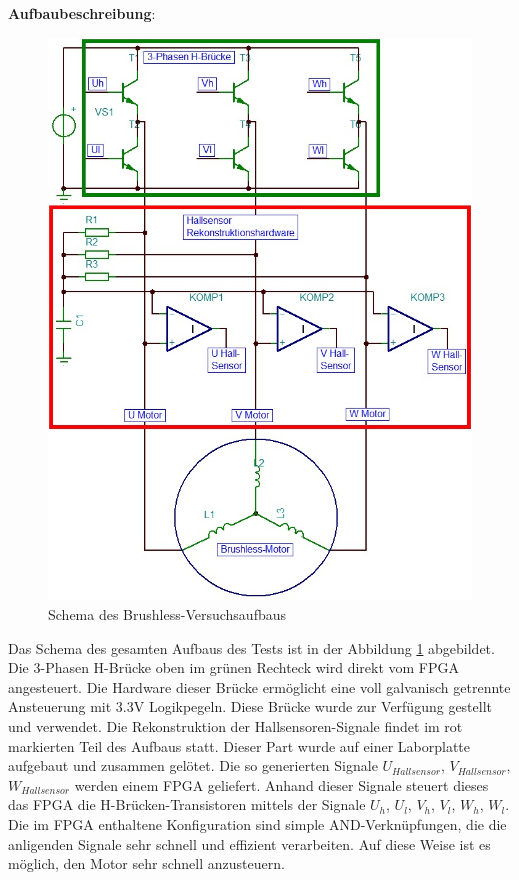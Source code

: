 \\
\\
\textbf{Aufbaubeschreibung}:
\begin{figure}
	\includegraphics[scale=0.4]{Funktionstests/Bilder/MotoransteuerungSchema.jpg}
	\centering
	\caption{Schema des Brushless-Versuchsaufbaus}
\label{abb:MotoransteuerungSchema}
\end{figure}
Das Schema des gesamten Aufbaus des Tests ist in der Abbildung \ref{abb:MotoransteuerungSchema} abgebildet. Die 3-Phasen H-Brücke oben im grünen Rechteck wird direkt vom FPGA angesteuert. Die Hardware dieser Brücke ermöglicht eine voll galvanisch getrennte Ansteuerung mit 3.3V Logikpegeln. Diese Brücke wurde zur Verfügung gestellt und verwendet. Die Rekonstruktion der Hallsensoren-Signale findet im rot markierten Teil des Aufbaus statt. Dieser Part wurde auf einer Laborplatte aufgebaut und zusammen gelötet. Die so generierten Signale $U_{Hallsensor}$, $V_{Hallsensor}$, $W_{Hallsensor}$ werden einem FPGA geliefert. Anhand dieser Signale steuert dieses das FPGA die H-Brücken-Transistoren mittels der Signale $U_h$, $U_l$, $V_h$, $V_l$, $W_h$, $W_l$. Die im FPGA enthaltene Konfiguration sind simple AND-Verknüpfungen, die die anligenden Signale sehr schnell und effizient verarbeiten. Auf diese Weise ist es möglich, den Motor sehr schnell anzusteuern.\\

